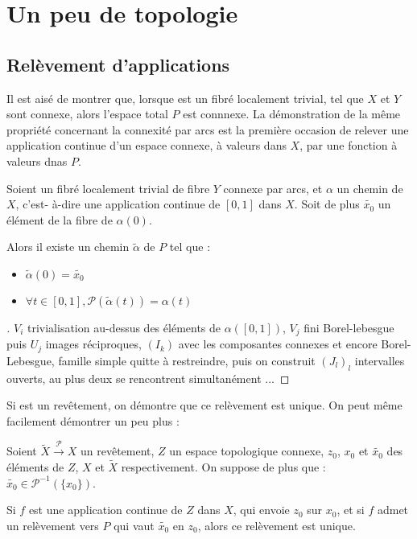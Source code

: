 \newpage

\section{Un peu de topologie}

\subsection{Rel\`evement d'applications}

Il est ais\'e de montrer que, lorsque \Fiy est un fibr\'e localement trivial, tel que $X$ et $Y$ sont connexe, alors l'espace total $P$ est connnexe. %
La d\'emonstration de la m\^eme propri\'et\'e concernant la connexit\'e par arcs est la premi\`ere occasion de relever une application continue d'un espace connexe, \`a valeurs dans $X$, %
par une fonction \`a valeurs dnas $P$.

\begin{prop}\label{rchefiy}
Soient \Fiy un fibr\'e localement trivial de fibre $Y$ connexe par arcs, et $\alpha$ un chemin de $X$, %
c'est- \`a-dire une application continue de $[0,1]$ dans $X$. %
Soit de plus $\tilde{x_0}$ un \'el\'ement de la fibre de $\alpha (0)$.

Alors il existe un chemin $\tilde{\alpha}$ de $P$ tel que :
\begin{itemize}
\item $\tilde{\alpha}(0)=\tilde{x_0}$
\item $\forall t \in [0,1] , \mathcal{P}(\tilde{\alpha}(t))=\alpha (t)$
\end{itemize}
\end{prop}

\begin{proof}[\es]
$V_i$ trivialisation au-dessus des \'el\'ements de $\alpha ([0,1])$, %
$V_j$ fini Borel-lebesgue puis $U_j$ images r\'eciproques, %
$(I_k)$ avec les composantes connexes et encore Borel-Lebesgue, famille simple quitte \`a restreindre,
puis on construit $(J_l)_l$ intervalles ouverts, au plus deux se rencontrent simultan\'ement ...
\end{proof}

Si \Fiy est un rev\^etement, on d\'emontre que ce rel\`evement est unique. On peut m\^eme facilement d\'emontrer un peu plus :

\begin{prop}\label{urc}
Soient $\tilde{X} \overset{\mathcal{P}}{\longrightarrow} X$ un rev\^etement, $Z$ un espace topologique connexe, %
$z_0$, $x_0$ et $\tilde{x_0}$ des \'el\'ements de $Z$, $X$ et $\tilde{X}$ respectivement. On suppose de plus que : $\tilde{x_0}\in\mathcal{P}^{-1}(\{x_0\})$.

Si $f$ est une application continue de $Z$ dans $X$, qui envoie $z_0$ sur $x_0$, et si $f$ admet un rel\`evement vers $P$ qui vaut $\tilde{x_0}$ en $z_0$, %
alors ce rel\`evement est unique.
\end{prop}

